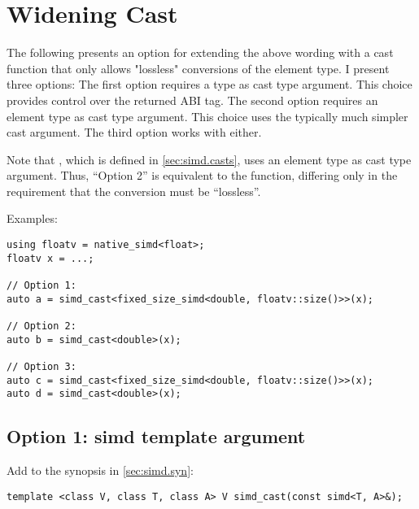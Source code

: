 \section{Widening Cast}\label{sec:widen}
The following presents an option for extending the above wording with a cast function that only allows "lossless" conversions of the element type.
I present three options:
The first option requires a \simd type as cast type argument. This choice provides control over the returned ABI tag.
The second option requires an element type as cast type argument. This choice uses the typically much simpler cast argument.
The third option works with either.

Note that , which is defined in \ref{sec:simd.casts}, uses an element type as cast type argument.
Thus, “Option 2” is equivalent to the  function, differing only in the requirement that the conversion must be “lossless”.

Examples:
\begin{lstlisting}[style=Vc]
using floatv = native_simd<float>;
floatv x = ...;

// Option 1:
auto a = simd_cast<fixed_size_simd<double, floatv::size()>>(x);

// Option 2:
auto b = simd_cast<double>(x);

// Option 3:
auto c = simd_cast<fixed_size_simd<double, floatv::size()>>(x);
auto d = simd_cast<double>(x);
\end{lstlisting}

\subsection{Option 1: simd template argument}

Add to the synopsis in \ref{sec:simd.syn}:
\begin{wgText}
  \begin{lstlisting}[style=Vc]
    template <class V, class T, class A> V simd_cast(const simd<T, A>&);
  \end{lstlisting}
\end{wgText}

